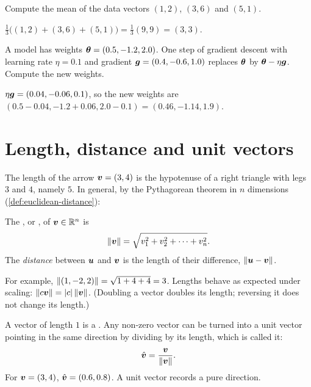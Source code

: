 \begin{exercise}
Compute the mean of the data vectors $(1, 2)$, $(3, 6)$ and $(5, 1)$.
\end{exercise}
\begin{solution}
$\tfrac13\bigl((1,2) + (3,6) + (5,1)\bigr) = \tfrac13(9, 9) = (3, 3)$.
\end{solution}

\begin{exercise}
A model has weights $\bm{\theta} = (0.5, -1.2, 2.0)$. One step of gradient descent
with learning rate $\eta = 0.1$ and gradient $\bm{g} = (0.4, -0.6, 1.0)$ replaces
$\bm{\theta}$ by $\bm{\theta} - \eta\bm{g}$. Compute the new weights.
\end{exercise}
\begin{solution}
$\eta\bm{g} = (0.04, -0.06, 0.1)$, so the new weights are
$(0.5 - 0.04, -1.2 + 0.06, 2.0 - 0.1) = (0.46, -1.14, 1.9)$.
\end{solution}

\section{Length, distance and unit vectors}\label{sec:vector-length}

The length of the arrow $\bm{v} = (3, 4)$ is the hypotenuse of a right triangle
with legs $3$ and $4$, namely $5$. In general, by the Pythagorean theorem in
$n$ dimensions (\cref{def:euclidean-distance}):

\begin{definition}\label{def:norm}
The , or , of
$\bm{v} \in \mathbb{R}^n$ is
\[
  \lVert\bm{v}\rVert = \sqrt{v_1^2 + v_2^2 + \dots + v_n^2}.
\]
The \emph{distance} between $\bm{u}$ and $\bm{v}$ is the length of their
difference, $\lVert\bm{u} - \bm{v}\rVert$.
\end{definition}

For example, $\lVert(1, -2, 2)\rVert = \sqrt{1 + 4 + 4} = 3$. Lengths behave as
expected under scaling: $\lVert c\bm{v}\rVert = \lvert c\rvert\,\lVert\bm{v}\rVert$. (Doubling a vector
doubles its length; reversing it does not change its length.)

A vector of length $1$ is a . Any non-zero vector can be
turned into a unit vector pointing in the same direction by dividing by its
length, which is called  it:
\[
  \hat{\bm{v}} = \frac{\bm{v}}{\lVert\bm{v}\rVert} .
\]
For $\bm{v} = (3, 4)$, $\hat{\bm{v}} = (0.6, 0.8)$. A unit vector records a pure
direction.

